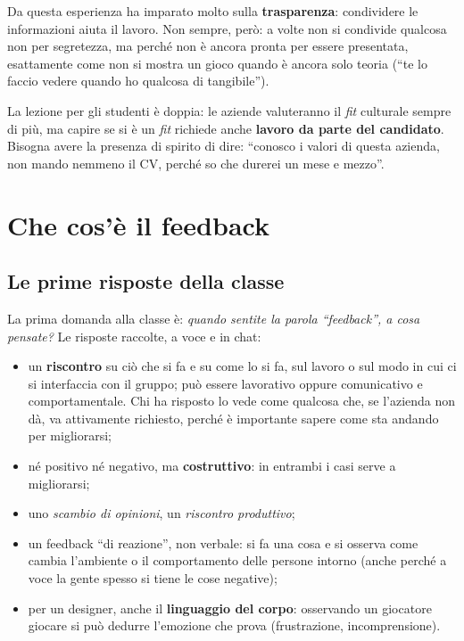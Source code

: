 Da questa esperienza ha imparato molto sulla \textbf{trasparenza}: condividere
le informazioni aiuta il lavoro. Non sempre, però: a volte non si condivide
qualcosa non per segretezza, ma perché non è ancora pronta per essere
presentata, esattamente come non si mostra un gioco quando è ancora solo
teoria (``te lo faccio vedere quando ho qualcosa di tangibile'').

La lezione per gli studenti è doppia: le aziende valuteranno il \emph{fit}
culturale sempre di più, ma capire se si è un \emph{fit} richiede anche
\textbf{lavoro da parte del candidato}. Bisogna avere la presenza di spirito
di dire: ``conosco i valori di questa azienda, non mando nemmeno il CV,
perché so che durerei un mese e mezzo''.

\section{Che cos'è il feedback}
\label{sec:z1-cose-feedback}

\subsection{Le prime risposte della classe}

La prima domanda alla classe è: \emph{quando sentite la parola
``feedback'', a cosa pensate?} Le risposte raccolte, a voce e in chat:
\begin{itemize}
  \item un \textbf{riscontro} su ciò che si fa e su come lo si fa, sul lavoro
        o sul modo in cui ci si interfaccia con il gruppo; può essere
        lavorativo oppure comunicativo e comportamentale. Chi ha risposto lo
        vede come qualcosa che, se l'azienda non dà, va attivamente
        richiesto, perché è importante sapere come sta andando per
        migliorarsi;
  \item né positivo né negativo, ma \textbf{costruttivo}: in entrambi i casi
        serve a migliorarsi;
  \item uno \emph{scambio di opinioni}, un \emph{riscontro produttivo};
  \item un feedback ``di reazione'', non verbale: si fa una cosa e si
        osserva come cambia l'ambiente o il comportamento delle persone
        intorno (anche perché a voce la gente spesso si tiene le cose
        negative);
  \item per un designer, anche il \textbf{linguaggio del corpo}: osservando
        un giocatore giocare si può dedurre l'emozione che prova (frustrazione,
        incomprensione).
\end{itemize}

